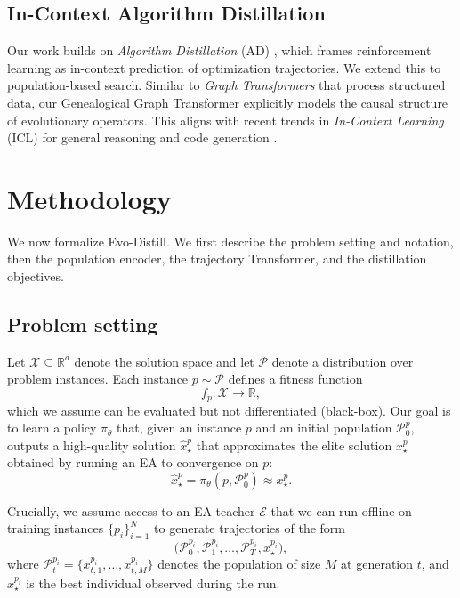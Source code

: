 \documentclass{article}
\begin{document}
\subsection{In-Context Algorithm Distillation}
Our work builds on \emph{Algorithm Distillation} (AD) \cite{laskin2022context}, which frames reinforcement learning as in-context prediction of optimization trajectories. We extend this to population-based search. Similar to \emph{Graph Transformers} \cite{dwivedi2020generalization, ying2021transformers} that process structured data, our Genealogical Graph Transformer explicitly models the causal structure of evolutionary operators. This aligns with recent trends in \emph{In-Context Learning} (ICL) for general reasoning \cite{kirsch2023general, lu2023structured} and code generation \cite{zhang2023planning}.

\section{Methodology}
\label{sec:method}

We now formalize Evo-Distill. We first describe the problem setting and notation, then the population encoder, the trajectory Transformer, and the distillation objectives.

\subsection{Problem setting}

Let $\mathcal{X} \subseteq \mathbb{R}^d$ denote the solution space and let $\mathcal{P}$ denote a distribution over problem instances. Each instance $p \sim \mathcal{P}$ defines a fitness function
\begin{equation}
    f_p : \mathcal{X} \to \mathbb{R},
\end{equation}
which we assume can be evaluated but not differentiated (black-box). Our goal is to learn a policy $\pi_\theta$ that, given an instance $p$ and an initial population $\mathcal{P}_0^p$, outputs a high-quality solution $\hat{x}_\star^p$ that approximates the elite solution $x_\star^p$ obtained by running an EA to convergence on $p$:
\begin{equation}
    \hat{x}_\star^p = \pi_\theta(p, \mathcal{P}_0^p) \approx x_\star^p.
\end{equation}

Crucially, we assume access to an EA teacher $\mathcal{E}$ that we can run offline on training instances $\{p_i\}_{i=1}^N$ to generate trajectories of the form
\begin{equation}
    \big(\mathcal{P}_0^{p_i}, \mathcal{P}_1^{p_i}, \dots, \mathcal{P}_T^{p_i}, x_\star^{p_i}\big),
\end{equation}
where $\mathcal{P}_t^{p_i} = \{x_{t,1}^{p_i}, \dots, x_{t,M}^{p_i}\}$ denotes the population of size $M$ at generation $t$, and $x_\star^{p_i}$ is the best individual observed during the run.
\end{document}
